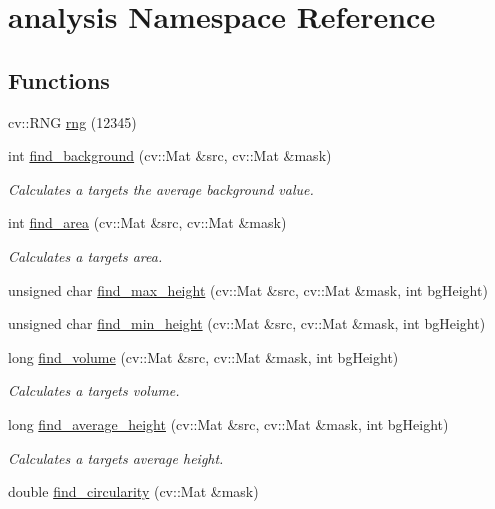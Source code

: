 \hypertarget{namespaceanalysis}{}\section{analysis Namespace Reference}
\label{namespaceanalysis}
\subsection*{Functions}
\begin{DoxyCompactItemize}
\item 
cv\+::\+R\+NG \hyperlink{namespaceanalysis_adac9def4c9a41ec6a7c2a03ac6c095cc}{rng} (12345)
\item 
int \hyperlink{namespaceanalysis_a6f9bf7edf5878b407c133ddbd89f7af8}{find\+\_\+background} (cv\+::\+Mat \&src, cv\+::\+Mat \&mask)
\begin{DoxyCompactList}\small\item\em Calculates a target\textquotesingle{}s the average background value. \end{DoxyCompactList}\item 
int \hyperlink{namespaceanalysis_ad544440f3a463acd72807f108c6c5fbf}{find\+\_\+area} (cv\+::\+Mat \&src, cv\+::\+Mat \&mask)
\begin{DoxyCompactList}\small\item\em Calculates a target\textquotesingle{}s area. \end{DoxyCompactList}\item 
unsigned char \hyperlink{namespaceanalysis_a3f5d294c05ef3a60c6c625a14462ee57}{find\+\_\+max\+\_\+height} (cv\+::\+Mat \&src, cv\+::\+Mat \&mask, int bg\+Height)
\item 
unsigned char \hyperlink{namespaceanalysis_a2b1a5cd712bd7a8d9bb92ca72f4af6e9}{find\+\_\+min\+\_\+height} (cv\+::\+Mat \&src, cv\+::\+Mat \&mask, int bg\+Height)
\item 
long \hyperlink{namespaceanalysis_a5a9ccaf8d4509e238bc361861913b778}{find\+\_\+volume} (cv\+::\+Mat \&src, cv\+::\+Mat \&mask, int bg\+Height)
\begin{DoxyCompactList}\small\item\em Calculates a target\textquotesingle{}s volume. \end{DoxyCompactList}\item 
long \hyperlink{namespaceanalysis_adb80c786b6da83f9a3a82f6e404350e0}{find\+\_\+average\+\_\+height} (cv\+::\+Mat \&src, cv\+::\+Mat \&mask, int bg\+Height)
\begin{DoxyCompactList}\small\item\em Calculates a target\textquotesingle{}s average height. \end{DoxyCompactList}\item 
double \hyperlink{namespaceanalysis_a6eb28fd6cbc5314e98708ce6a43f457f}{find\+\_\+circularity} (cv\+::\+Mat \&mask)
\end{DoxyCompactItemize}
